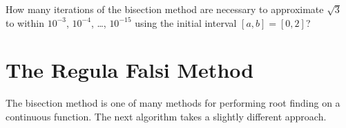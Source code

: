 \begin{problem}
    How many iterations of the bisection method are necessary to approximate $\sqrt{3}$ to
    within $10^{-3}$, $10^{-4}$, \dots, $10^{-15}$ using the initial interval
    $[a,b]=[0,2]$?
\end{problem}



\newpage\section{The Regula Falsi Method}
The bisection method is one of many methods for performing root finding on a continuous
function.  The next algorithm takes a slightly different approach.

